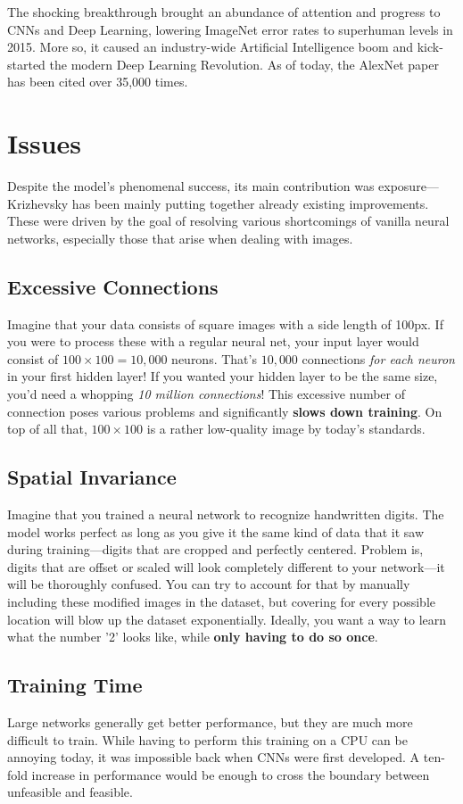 \documentclass{article}
\begin{document}
The shocking breakthrough brought an abundance of attention and progress to CNNs and Deep Learning, lowering ImageNet error rates to superhuman levels in 2015. More so, it caused an industry-wide Artificial Intelligence boom and kick-started the modern Deep Learning Revolution. As of today, the AlexNet paper has been cited over 35,000 times.


\section{Issues}
Despite the model's phenomenal success, its main contribution was exposure—Krizhevsky has been mainly putting together already existing improvements. These were driven by the goal of resolving various shortcomings of vanilla neural networks, especially those that arise when dealing with images.

\subsection{Excessive Connections}
Imagine that your data consists of square images with a side length of 100px. If you were to process these with a regular neural net, your input layer would consist of $100 \times100=10,000$ neurons. That's $10,000$ connections \textit{for each neuron} in your first hidden layer! If you wanted your hidden layer to be the same size, you'd need a whopping \textit{10 million connections}! This excessive number of connection poses various problems and significantly \textbf{slows down training}. On top of all that, $100 \times100$ is a rather low-quality image by today's standards.

\subsection{Spatial Invariance}
Imagine that you trained a neural network to recognize handwritten digits. The model works perfect as long as you give it the same kind of data that it saw during training—digits that are cropped and perfectly centered. Problem is, digits that are offset or scaled will look completely different to your network—it will be thoroughly confused. You can try to account for that by manually including these modified images in the dataset, but covering for every possible location will blow up the dataset exponentially. Ideally, you want a way to learn what the number '2' looks like, while \textbf{only having to do so once}.

\subsection{Training Time}
Large networks generally get better performance, but they are much more difficult to train. While having to perform this training on a CPU can be annoying today, it was impossible back when CNNs were first developed. A ten-fold increase in performance would be enough to cross the boundary between unfeasible and feasible.
\end{document}
